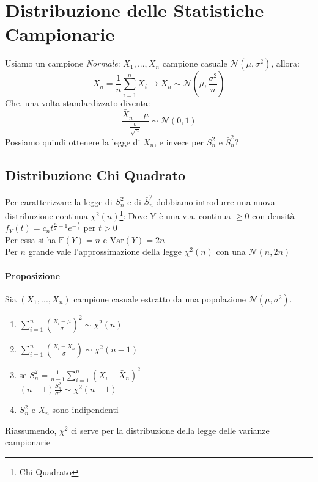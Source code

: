 \section{Distribuzione delle Statistiche Campionarie}
Usiamo un campione \emph{Normale}:
$X_1, ..., X_n$ campione casuale $\mathcal{N}(\mu, \sigma^2)$, allora:
\[
    \bar{X}_n = \frac{1}{n} \sum_{i=1}^n X_i \to \bar{X}_n \sim \mathcal{N}(\mu, \frac{\sigma^2}{n})
\]
Che, una volta standardizzato diventa:
\begin{equation*}
    \frac{\bar{X}_n-\mu}{\frac{\sigma}{\sqrt{n}}} \sim \mathcal{N}(0,1)
\end{equation*}
Possiamo quindi ottenere la legge di $X_n$, e invece per $S_{n}^2$ e $\bar{S}_{n}^2$?


\subsection{Distribuzione Chi Quadrato}
Per caratterizzare la legge di $S_{n}^2$ e di $\bar{S}_{n}^2$ dobbiamo
introdurre una nuova distribuzione continua $\chi^2(n)$\footnote{Chi Quadrato}:
Dove Y è una v.a. continua $\geq 0$ con densità $f_Y(t) = c_n t^{\frac{n}{2}-1} e^{-\frac{t}{2}} $ per $ t>0$
\\ Per essa si ha $\mathbb{E}(Y) = n$ e $\text{Var}(Y)=2n$
\\ Per $n$ grande vale l'approssimazione della legge $\chi^2(n)$ con una
$\mathcal{N}(n,2n)$
\paragraph*{Proposizione} Sia $(X_1, ..., X_n)$ campione casuale estratto
da una popolazione $\mathcal{N}(\mu, \sigma^2)$.
\begin{enumerate}
    \item $\sum_{i=1}^n(\frac{X_i-\mu}{\sigma})^2 \sim \chi^2(n)$
    \item $\sum_{i=1}^n(\frac{X_i-\bar{X}_n}{\sigma}) \sim \chi^2(n-1)$
    \item se $S_{n}^2 = \frac{1}{n-1}\sum_{i=1}^n(X_i - \bar{X}_n)^2$
    \\ $(n-1)\frac{S_{n}^2}{\sigma^2} \sim \chi^2(n-1)$
    \item $S_{n}^2$ e $\bar{X}_n$ sono indipendenti
\end{enumerate}
Riassumendo, $\chi^2$ ci serve per la distribuzione della legge delle varianze campionarie


